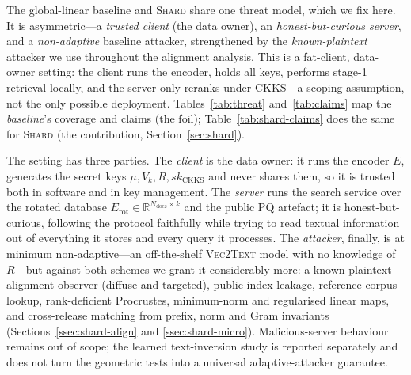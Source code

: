 The global-linear baseline and \textsc{Shard} share one threat model, which
we fix here. It is asymmetric---a \emph{trusted client} (the data owner), an
\emph{honest-but-curious server}, and a \emph{non-adaptive} baseline
attacker, strengthened by the \emph{known-plaintext} attacker we use
throughout the alignment analysis. This is a fat-client, data-owner setting:
the client runs the encoder, holds all keys, performs stage-1 retrieval
locally, and the server only reranks under CKKS---a scoping assumption, not
the only possible deployment. Tables~\ref{tab:threat} and~\ref{tab:claims}
map the \emph{baseline}'s coverage and claims (the foil);
Table~\ref{tab:shard-claims} does the same for \textsc{Shard} (the
contribution, Section~\ref{sec:shard}).

The setting has three parties. The \emph{client} is the data owner: it runs
the encoder $E$, generates the secret keys $\mu, V_k, R, sk_{\mathrm{CKKS}}$
and never shares them, so it is trusted both in software and in key
management. The \emph{server} runs the search service over the rotated
database $E_{\mathrm{rot}} \in \mathbb{R}^{N_{\mathrm{docs}} \times k}$ and the
public PQ artefact; it is honest-but-curious, following the protocol
faithfully while trying to read textual information out of everything it
stores and every query it processes. The \emph{attacker}, finally, is at
minimum non-adaptive---an off-the-shelf \textsc{Vec2Text} model with no
knowledge of $R$---but against both schemes we grant it considerably more: a
known-plaintext alignment observer (diffuse and targeted), public-index
leakage, reference-corpus lookup, rank-deficient Procrustes, minimum-norm and
regularised linear maps, and cross-release matching from prefix, norm and
Gram invariants (Sections~\ref{ssec:shard-align} and
\ref{ssec:shard-micro}). Malicious-server behaviour remains out of scope;
the learned text-inversion study is reported separately and does not turn the
geometric tests into a universal adaptive-attacker guarantee.

